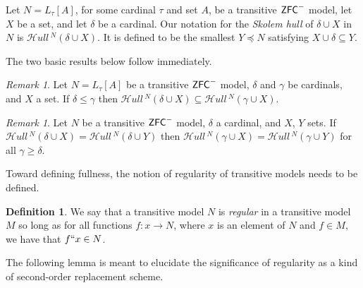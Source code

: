 \documentclass{amsart}
\theoremstyle{definition}
\newtheorem{definition}[theorem]{Definition}
\theoremstyle{remark}
\newtheorem{remark}[theorem]{Remark}
\newcommand{\ZFC}{\textup{\ensuremath{\textsf{ZFC}}}}
\newcommand{\To}{\longrightarrow}
\newcommand{\SH}{\mathcal{H}\textit{ull} \,}
\newcommand{\Sk}[3]{\SH^{#1}( {#2} \cup {#3} ) }
\begin{document}
Let $N = L_\tau[A]$, for some cardinal $\tau$ and set $A$, be a transitive $\ZFC^-$ model, let $X$ be a set, and let $\delta$ be a cardinal. Our notation for the \emph{Skolem hull} of $\delta \cup X$ in $N$ is $\Sk{N}{\delta}{X}$. It is defined to be the smallest $Y \preccurlyeq N$ satisfying $X \cup \delta \subseteq Y$.
	
The two basic results below follow immediately.

\begin{remark} \label{remark:subsethull}
Let $N=L_\tau[A]$ be a transitive $\ZFC^-$ model, $\delta$ and $\gamma$ be cardinals, and $X$ a set. If $\delta \leq \gamma$ then $\Sk{N}{\delta}{X} \subseteq \Sk{N}{\gamma}{X}$. 
\end{remark}

\begin{remark} \label{remark:hullequality} Let $N$ be a transitive $\ZFC^-$ model, $\delta$ a cardinal, and $X$, $Y$ sets. If $\Sk{N}{\delta}{X} = \Sk{N}{\delta}{Y}$ then $\Sk{N}{\gamma}{X} = \Sk{N}{\gamma}{Y}$ for all $\gamma \geq \delta$. \end{remark}

Toward defining fullness, the notion of regularity of transitive models needs to be defined.

\begin{definition} We say that a transitive model $N$ is \emph{regular} in a transitive model $M$ so long as for all functions $f: x \To N$, where $x$ is an element of $N$ and $f \in M$, we have that $f``x \in N$. \end{definition}
The following lemma is meant to elucidate the significance of regularity as a kind of second-order
replacement scheme.
\end{document}
